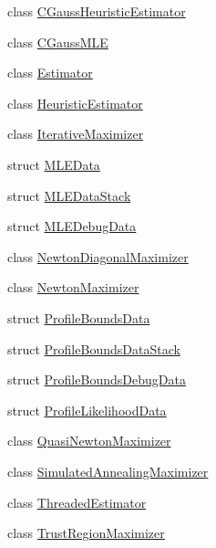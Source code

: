 \begin{DoxyCompactItemize}
\item 
class \hyperlink{classmappel_1_1estimator_1_1CGaussHeuristicEstimator}{C\+Gauss\+Heuristic\+Estimator}
\item 
class \hyperlink{classmappel_1_1estimator_1_1CGaussMLE}{C\+Gauss\+M\+LE}
\item 
class \hyperlink{classmappel_1_1estimator_1_1Estimator}{Estimator}
\item 
class \hyperlink{classmappel_1_1estimator_1_1HeuristicEstimator}{Heuristic\+Estimator}
\item 
class \hyperlink{classmappel_1_1estimator_1_1IterativeMaximizer}{Iterative\+Maximizer}
\item 
struct \hyperlink{namespacemappel_1_1estimator_structmappel_1_1estimator_1_1MLEData}{M\+L\+E\+Data}
\item 
struct \hyperlink{namespacemappel_1_1estimator_structmappel_1_1estimator_1_1MLEDataStack}{M\+L\+E\+Data\+Stack}
\item 
struct \hyperlink{structmappel_1_1estimator_1_1MLEDebugData}{M\+L\+E\+Debug\+Data}
\item 
class \hyperlink{classmappel_1_1estimator_1_1NewtonDiagonalMaximizer}{Newton\+Diagonal\+Maximizer}
\item 
class \hyperlink{classmappel_1_1estimator_1_1NewtonMaximizer}{Newton\+Maximizer}
\item 
struct \hyperlink{structmappel_1_1estimator_1_1ProfileBoundsData}{Profile\+Bounds\+Data}
\item 
struct \hyperlink{structmappel_1_1estimator_1_1ProfileBoundsDataStack}{Profile\+Bounds\+Data\+Stack}
\item 
struct \hyperlink{namespacemappel_1_1estimator_structmappel_1_1estimator_1_1ProfileBoundsDebugData}{Profile\+Bounds\+Debug\+Data}
\item 
struct \hyperlink{namespacemappel_1_1estimator_structmappel_1_1estimator_1_1ProfileLikelihoodData}{Profile\+Likelihood\+Data}
\item 
class \hyperlink{classmappel_1_1estimator_1_1QuasiNewtonMaximizer}{Quasi\+Newton\+Maximizer}
\item 
class \hyperlink{classmappel_1_1estimator_1_1SimulatedAnnealingMaximizer}{Simulated\+Annealing\+Maximizer}
\item 
class \hyperlink{classmappel_1_1estimator_1_1ThreadedEstimator}{Threaded\+Estimator}
\item 
class \hyperlink{classmappel_1_1estimator_1_1TrustRegionMaximizer}{Trust\+Region\+Maximizer}
\end{DoxyCompactItemize}
